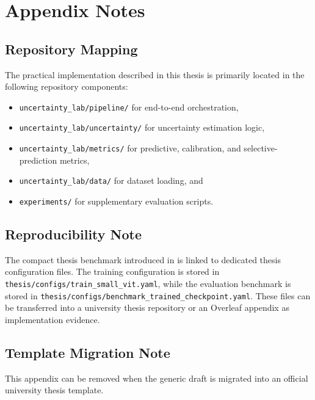 \chapter{Appendix Notes}

\section{Repository Mapping}

The practical implementation described in this thesis is primarily located in the following repository components:

\begin{itemize}
    \item \texttt{uncertainty\_lab/pipeline/} for end-to-end orchestration,
    \item \texttt{uncertainty\_lab/uncertainty/} for uncertainty estimation logic,
    \item \texttt{uncertainty\_lab/metrics/} for predictive, calibration, and selective-prediction metrics,
    \item \texttt{uncertainty\_lab/data/} for dataset loading, and
    \item \texttt{experiments/} for supplementary evaluation scripts.
\end{itemize}

\section{Reproducibility Note}

The compact thesis benchmark introduced in  is linked to dedicated thesis configuration files. The training configuration is stored in \texttt{thesis/configs/train\_small\_vit.yaml}, while the evaluation benchmark is stored in \texttt{thesis/configs/benchmark\_trained\_checkpoint.yaml}. These files can be transferred into a university thesis repository or an Overleaf appendix as implementation evidence.

\section{Template Migration Note}

This appendix can be removed when the generic draft is migrated into an official university thesis template.
